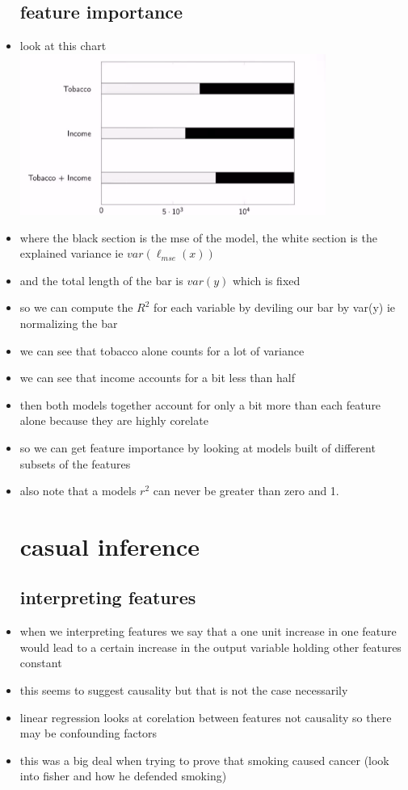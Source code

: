 \documentclass{article}
\begin{document}
\begin{itemize}
\subsection*{feature importance}
\item look at this chart \\ \includegraphics*[width=10cm]{notes/week_11/immages/w11_6.png}
\item where the black section is the mse of the model, the white section is the explained variance ie $var(\ell_{mse}(x))$
\item and the total length of the bar is $var(y)$ which is fixed
\item so we can compute the $R^2$ for each variable by deviling our bar by var(y) ie normalizing the bar 
\item we can see that tobacco alone counts for a lot of variance
\item we can see that income accounts for a bit less than half 
\item then both models together account for only a bit more than each feature alone because they are highly corelate
\item so we can get feature importance by looking at models built of different subsets of the features
\item also note that a models $r^2$ can never be greater than zero and 1. 
 \section{casual inference}
 \subsection*{interpreting features}
 \item when we interpreting features we say that a one unit increase in one feature would lead to a certain 
 increase in the output variable holding other features constant
 \item this seems to suggest causality but that is not the case necessarily  
\item linear regression looks at corelation between features not causality so there may be confounding factors
\item this was a big deal when trying to prove that smoking caused cancer (look into fisher and how he defended smoking)

\end{itemize}
\end{document}

